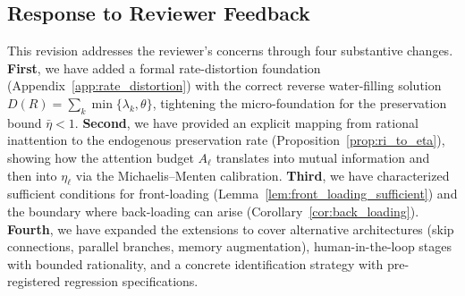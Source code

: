 \subsection{Response to Reviewer Feedback}

This revision addresses the reviewer's concerns through four substantive changes. \textbf{First}, we have added a formal rate-distortion foundation (Appendix~\ref{app:rate_distortion}) with the correct reverse water-filling solution $D(R) = \sum_k \min\{\lambda_k, \theta\}$, tightening the micro-foundation for the preservation bound $\bar{\eta} < 1$. \textbf{Second}, we have provided an explicit mapping from rational inattention to the endogenous preservation rate (Proposition~\ref{prop:ri_to_eta}), showing how the attention budget $A_\ell$ translates into mutual information and then into $\eta_\ell$ via the Michaelis--Menten calibration. \textbf{Third}, we have characterized sufficient conditions for front-loading (Lemma~\ref{lem:front_loading_sufficient}) and the boundary where back-loading can arise (Corollary~\ref{cor:back_loading}). \textbf{Fourth}, we have expanded the extensions to cover alternative architectures (skip connections, parallel branches, memory augmentation), human-in-the-loop stages with bounded rationality, and a concrete identification strategy with pre-registered regression specifications.
